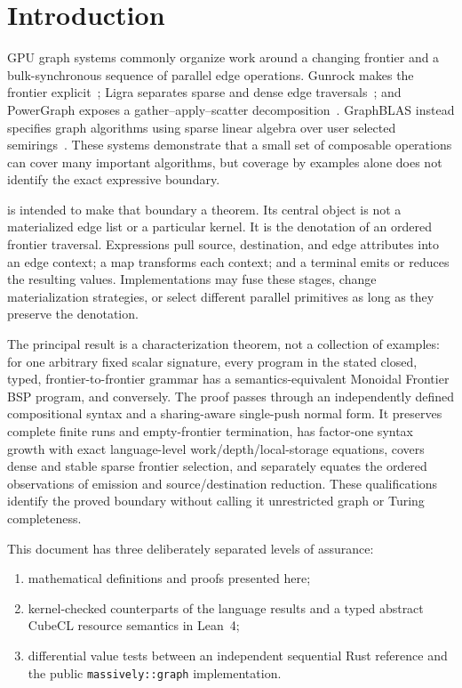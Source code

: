 \section{Introduction}

GPU graph systems commonly organize work around a changing frontier and a
bulk-synchronous sequence of parallel edge operations.  Gunrock makes the
frontier explicit~\cite{wang2016gunrock}; Ligra separates sparse and dense
edge traversals~\cite{shun2013ligra}; and PowerGraph exposes a
gather--apply--scatter decomposition~\cite{gonzalez2012powergraph}.  GraphBLAS
instead specifies graph algorithms using sparse linear algebra over user
selected semirings~\cite{kepner2016graphblas}.  These systems demonstrate that
a small set of composable operations can cover many important algorithms, but
coverage by examples alone does not identify the exact expressive boundary.

\TA{} is intended to make that boundary a theorem.  Its central object is not
a materialized edge list or a particular kernel.  It is the denotation of an
ordered frontier traversal.  Expressions pull source, destination, and edge
attributes into an edge context; a map transforms each context; and a terminal
emits or reduces the resulting values.  Implementations may fuse these stages,
change materialization strategies, or select different parallel primitives as
long as they preserve the denotation.

The principal result is a characterization theorem, not a collection of
examples: for one arbitrary fixed scalar signature, every program in the
stated closed, typed, frontier-to-frontier \TA{} grammar has a
semantics-equivalent Monoidal Frontier BSP program, and conversely.  The proof
passes through an independently defined compositional syntax and a
sharing-aware single-push normal form.  It preserves complete finite runs and
empty-frontier termination, has factor-one syntax growth with exact
language-level work/depth/local-storage equations, covers dense and stable
sparse frontier selection, and separately equates the ordered observations of
emission and source/destination reduction.  These qualifications identify the
proved boundary without calling it unrestricted graph or Turing completeness.

This document has three deliberately separated levels of assurance:

\begin{enumerate}
  \item mathematical definitions and proofs presented here;
  \item kernel-checked counterparts of the language results and a typed
        abstract CubeCL resource semantics in Lean~4;
  \item differential value tests between an independent sequential Rust
        reference and the public \texttt{massively::graph} implementation.
\end{enumerate}

